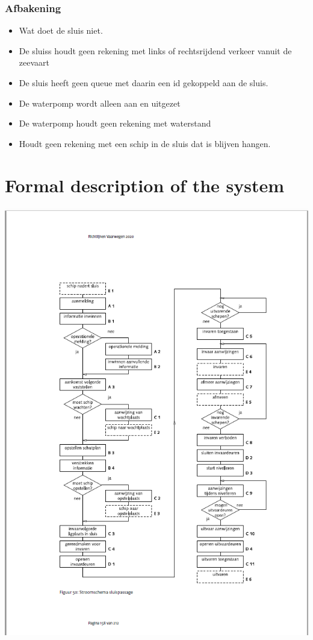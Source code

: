 \subsection{Afbakening}
\begin{itemize}
	\item Wat doet de sluis niet.
	\item De sluiss houdt geen rekening met links of rechtsrijdend verkeer vanuit de zeevaart
	\item De sluis heeft geen queue met daarin een id gekoppeld aan de sluis.
	\item De waterpomp wordt alleen aan en uitgezet
	\item De waterpomp houdt geen rekening met waterstand
	\item Houdt geen rekening met een schip in de sluis dat is blijven hangen.
	
\end{itemize}

\chapter{Formal description of the system}

\includegraphics[scale=0.65]{sluispassage.png}


